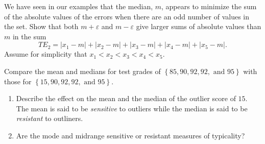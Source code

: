 \documentclass[10pt,]{book}
\theoremstyle{ptxdefinitionnotitle}
\theoremstyle{ptxdefinitiontitle}
\numberwithin{equation}{section}
\newcommand{\lt}{<}
\begin{document}
\begin{divisionexercise}{3}\hypertarget{exercise-6}{}
\hypertarget{p-77}{}%
We have seen in our examples that the median, \(m\), appears to minimize the sum of the absolute values of the errors when there are an odd number of values in the set. Show that both \(m + \varepsilon\) and \(m - \varepsilon\) give larger sums of absolute values than \(m\) in the sum%
\begin{equation*}
T{E_2} = \left| {{x_1} - m} \right| + \left| {{x_2} - m} \right| + \left| {{x_3} - m} \right| + \left| {{x_4} - m} \right| + \left| {{x_5} - m} \right|\text{.}
\end{equation*}
Assume for simplicity that \({x_1} \lt {x_2} \lt {x_3} \lt {x_4} \lt {x_5}\). \\%
\end{divisionexercise}%
\begin{divisionexercise}{4}\hypertarget{exercise-7}{}
\hypertarget{p-78}{}%
Compare the mean and medians for test grades of \(\left\{ {85, 90, 92, 92,\text{ and } 95} \right\}\) with those for \(\left\{ {15, 90, 92, 92,\text{ and } 95} \right\}\).%
\leavevmode%
\begin{enumerate}[label=(\alph*)]
\item\hypertarget{li-4}{}Describe the effect on the mean and the median of the outlier score of \(15\). The mean is said to be \emph{sensitive} to outliers while the median is said to be \emph{resistant} to outliners.%
\item\hypertarget{li-5}{}Are the mode and midrange sensitive or resistant measures of typicality?%
\end{enumerate}
\end{divisionexercise}%
\typeout{************************************************}
\typeout{************************************************}
\end{document}
